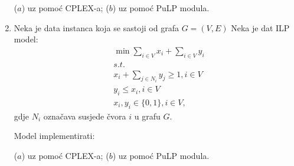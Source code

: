 \documentclass[a4paper, utf8, 11pt, colorlinks]{book}
\begin{document}
\begin{enumerate}
     ($a$) uz pomoć CPLEX-a; ($b$) uz pomoć PuLP modula.
    \item %
    Neka je data instanca koja se sastoji od grafa $G=(V,E)$ %
    Neka je dat ILP model:
    \begin{align*}
          &\min \sum_{i \in V} x_i + \sum_{i \in V} y_i \\
          &s.t. \\
          & x_i + \sum_{j \in N_i } y_j  \geq 1, i \in V \\
          & y_i \leq x_i, i \in V \\
          &x_i, y_i \in \{0, 1\}, i \in V,
    \end{align*}
gdje $N_i$ označava susjede čvora $i$ u grafu $G$. 

Model implementirati:

($a$) uz pomoć CPLEX-a; ($b$) uz pomoć PuLP modula. 
\end{enumerate}
\end{document}
